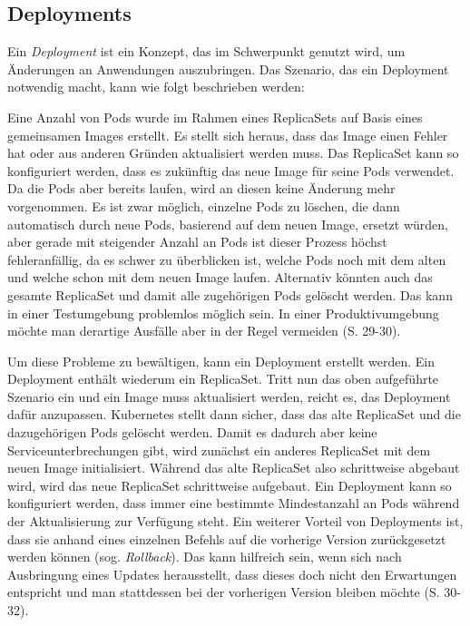 \documentclass[11pt,a4paper]{article}
\begin{document}
\subsection{Deployments}
\label{sec:Deployments}
Ein \emph{Deployment} ist ein Konzept, das im Schwerpunkt genutzt wird, um Änderungen an Anwendungen auszubringen.
Das Szenario, das ein Deployment notwendig macht, kann wie folgt beschrieben werden:

Eine Anzahl von Pods wurde im Rahmen eines ReplicaSets auf Basis eines gemeinsamen Images erstellt.
Es stellt sich heraus, dass das Image einen Fehler hat oder aus anderen Gründen aktualisiert werden muss.
Das ReplicaSet kann so konfiguriert werden, dass es zukünftig das neue Image für seine Pods verwendet.
Da die Pods aber bereits laufen, wird an diesen keine Änderung mehr vorgenommen. Es ist zwar möglich,
einzelne Pods zu löschen, die dann automatisch durch neue Pods, basierend auf dem neuen Image, ersetzt würden, aber
gerade mit steigender Anzahl an Pods ist dieser Prozess höchst
fehleranfällig, da es schwer zu überblicken ist, welche Pods noch mit dem alten und welche schon mit dem
neuen Image laufen. Alternativ könnten auch das gesamte ReplicaSet und damit alle zugehörigen Pods gelöscht werden.
Das kann in einer Testumgebung problemlos möglich sein. In einer Produktivumgebung möchte man derartige
Ausfälle aber in der Regel vermeiden \cite{Schmeling_Dargatz_2022} (S. 29-30). %

Um diese Probleme zu bewältigen, kann ein Deployment erstellt werden.
Ein Deployment enthält wiederum ein ReplicaSet. Tritt nun das oben aufgeführte Szenario ein und ein Image
muss aktualisiert werden, reicht es, das Deployment dafür anzupassen.
Kubernetes stellt dann sicher, dass das alte ReplicaSet und die dazugehörigen Pods gelöscht werden.
Damit es dadurch aber keine Serviceunterbrechungen gibt, wird zunächst ein anderes ReplicaSet mit dem neuen
Image initialisiert. Während das alte ReplicaSet also schrittweise abgebaut wird, wird das neue ReplicaSet
schrittweise aufgebaut. Ein Deployment kann so konfiguriert werden, dass immer eine bestimmte Mindestanzahl an
Pods während der Aktualisierung zur Verfügung steht.
Ein weiterer Vorteil von Deployments ist, dass sie anhand eines einzelnen Befehls auf die vorherige Version
zurückgesetzt werden können (sog. \emph{Rollback}). Das kann hilfreich sein, wenn sich nach Ausbringung eines
Updates herausstellt, dass dieses doch nicht den Erwartungen entspricht und man stattdessen bei der vorherigen
Version bleiben möchte \cite{Schmeling_Dargatz_2022} (S. 30-32).
\end{document}
